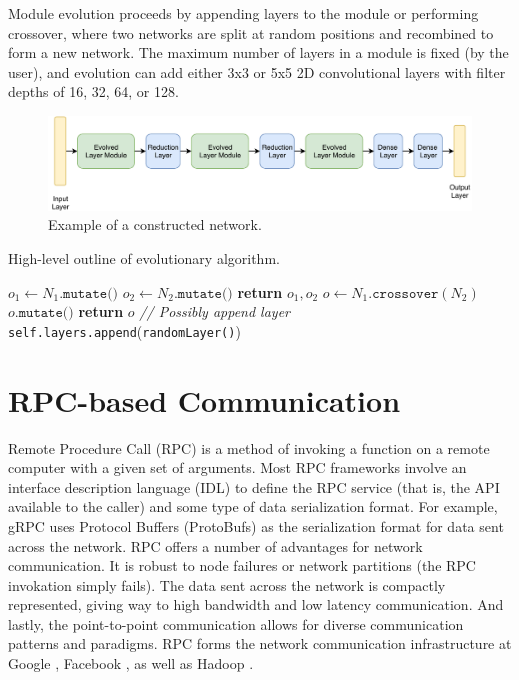 \documentclass[conference]{IEEEtran}
\begin{document}
Module evolution proceeds by appending layers to the module or performing
crossover, where two networks are split at random positions and recombined
to form a new network. The maximum number of layers in a module is fixed
(by the user), and evolution can add either 3x3 or 5x5 2D convolutional
layers with filter depths of 16, 32, 64, or 128.

\begin{figure}
  \centering
  \includegraphics[width=.85\textwidth]{img/sample_arch}
  \caption{Example of a constructed network.}
  \label{fig:sample-arch}
\end{figure}


\begin{algorithm}
  \caption{High-level outline of evolutionary algorithm.}\label{alg:evo-simple}
  \begin{algorithmic}[1]
    \State $o_1\gets N_1.\texttt{mutate()}$
    \State $o_2 \gets N_2.\texttt{mutate()}$
    \State \textbf{return } $o_1, o_2$
    \EndIf
    \State $o \gets N_1.\texttt{crossover}(N_2)$
    \State $o.\texttt{mutate()}$
    \State \textbf{return } $o$
  \EndProcedure
  \State \emph{// Possibly append layer}
  \State \texttt{self.layers.append}(\texttt{randomLayer()})
  \EndIf
  \EndProcedure
  \end{algorithmic}
\end{algorithm}

\section{RPC-based Communication}
Remote Procedure Call (RPC) is a method of invoking a function on a remote
computer with a given set of arguments. Most RPC frameworks involve an interface
description language (IDL)
to define the RPC service (that is, the API available to the caller) and some
type of data serialization format. For example, gRPC uses Protocol Buffers (ProtoBufs)
\cite{Varda2008} as the serialization format for data sent across the network.
RPC offers a number of advantages for network communication. It is robust to
node failures or network partitions (the RPC invokation simply fails). The data
sent across the network is compactly represented, giving way to high bandwidth
and low latency communication. And lastly, the point-to-point communication allows for
diverse communication patterns and paradigms. RPC forms the network communication
infrastructure at Google \cite{van2017production}, Facebook \cite{Slee2007},
as well as Hadoop
\cite{Shvachko:2010:HDF:1913798.1914427, Lu:2013:HDH:2570457.2571128}.
\end{document}
